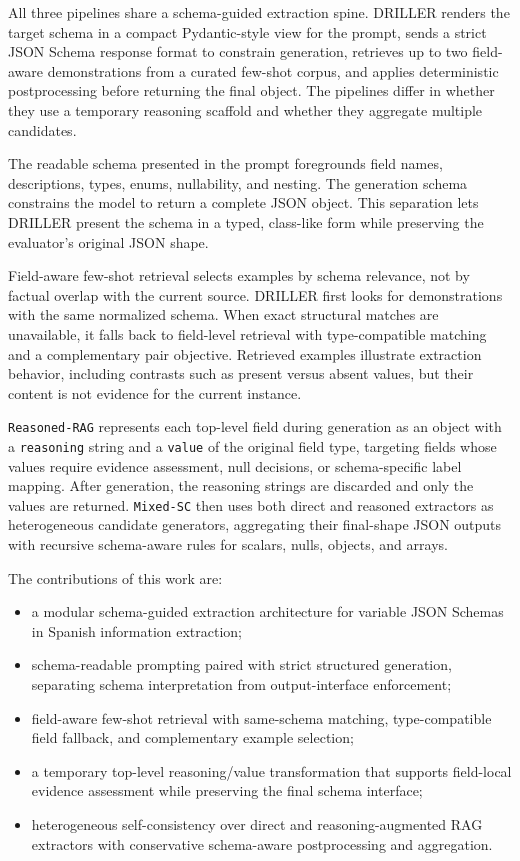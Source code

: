 All three pipelines share a schema-guided extraction spine. DRILLER renders the target schema in a compact Pydantic-style view for the prompt, sends a strict JSON Schema response format to constrain generation, retrieves up to two field-aware demonstrations from a curated few-shot corpus, and applies deterministic postprocessing before returning the final object. The pipelines differ in whether they use a temporary reasoning scaffold and whether they aggregate multiple candidates.

The readable schema presented in the prompt foregrounds field names, descriptions, types, enums, nullability, and nesting. The generation schema constrains the model to return a complete JSON object. This separation lets DRILLER present the schema in a typed, class-like form while preserving the evaluator's original JSON shape.

Field-aware few-shot retrieval selects examples by schema relevance, not by factual overlap with the current source. DRILLER first looks for demonstrations with the same normalized schema. When exact structural matches are unavailable, it falls back to field-level retrieval with type-compatible matching and a complementary pair objective. Retrieved examples illustrate extraction behavior, including contrasts such as present versus absent values, but their content is not evidence for the current instance.

\texttt{Reasoned-RAG} represents each top-level field during generation as an object with a \texttt{reasoning} string and a \texttt{value} of the original field type, targeting fields whose values require evidence assessment, null decisions, or schema-specific label mapping. After generation, the reasoning strings are discarded and only the values are returned. \texttt{Mixed-SC} then uses both direct and reasoned extractors as heterogeneous candidate generators, aggregating their final-shape JSON outputs with recursive schema-aware rules for scalars, nulls, objects, and arrays.

The contributions of this work are:
\begin{itemize}
    \item a modular schema-guided extraction architecture for variable JSON Schemas in Spanish information extraction;
    \item schema-readable prompting paired with strict structured generation, separating schema interpretation from output-interface enforcement;
    \item field-aware few-shot retrieval with same-schema matching, type-compatible field fallback, and complementary example selection;
    \item a temporary top-level reasoning/value transformation that supports field-local evidence assessment while preserving the final schema interface;
    \item heterogeneous self-consistency over direct and reasoning-augmented RAG extractors with conservative schema-aware postprocessing and aggregation.
\end{itemize}


